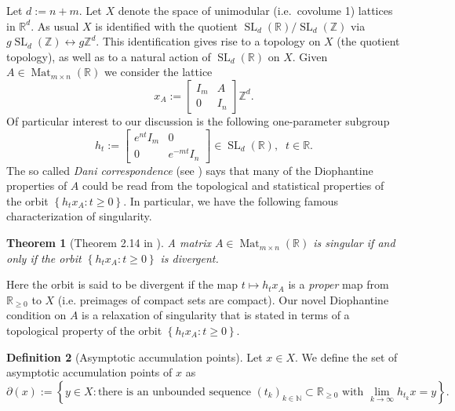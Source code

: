 \documentclass[reqno,11pt, twoside]{amsart}
\theoremstyle{plain}
\newtheorem{thm}{Theorem}[section]
\theoremstyle{definition}
\newtheorem{defn}[thm]{Definition}
\theoremstyle{definition}
\theoremstyle{remark}
\numberwithin{equation}{section}
\newcommand{\SL}{\operatorname{SL}}
\newcommand{\R}{{\mathbb{R}}}
\newcommand{\Z}{{\mathbb{Z}}}
\newcommand{\N}{{\mathbb{N}}}
\newcommand{\bR}{\mathbb{R}}
\newcommand{\bZ}{\mathbb{Z}}
\newcommand\seta[1]{\left\{#1\right\}}
\newcommand\on[1]{\operatorname{#1}}
\begin{document}
Let $d:=n+m$. Let $X$ denote the space of unimodular (i.e.\ covolume 1) lattices 
in $\bR^d$. As usual $X$ is identified with the quotient $\SL_d(\bR)/\SL_d(\bZ)$ via $g\SL_d(\bZ)\leftrightarrow g\bZ^d$. This identification gives rise to a topology on $X$ (the quotient topology), as well as to a natural action of $\SL_d(\bR)$ on $X$. 
Given $A \in \on{Mat}_{m\times n}(\R)$ we consider the lattice
\begin{equation}\label{eq: xA}
    x_A := \left[ {\begin{array}{cc} I_m & A \\ 
    0 & I_n  \end{array}}\right]\Z^d.
\end{equation}
Of particular interest to our discussion is the following one-parameter subgroup
\begin{equation}\label{eq: ht definition}
    h_t := \left[ {\begin{array}{cc} e^{nt}I_m & 0 \\ 
    0 & e^{-mt}I_n  \end{array}}\right] \in \SL_d(\bR),\;\; t\in \bR.
\end{equation}
The so called \textit{Dani correspondence} (see \cite{Dadivergent}) says that many 
of the Diophantine properties of $A$ could be read from the topological and statistical properties of the orbit $\seta{h_tx_A:t\ge 0}$. 
In particular, we have the following famous characterization of singularity.
\begin{thm}[Theorem 2.14 in \cite{Dadivergent}]\label{thm: Dani singular}
    A matrix $A \in \on{Mat}_{m\times n}(\R)$ is singular if and only if the orbit 
    $\seta{h_tx_A:t\ge 0}$
    is divergent.
\end{thm}
Here the orbit is said to be divergent if the map $t\mapsto h_tx_A$ is a \textit{proper} map from $\bR_{\ge0}$ to $X$ (i.e. preimages of compact sets are compact). 
Our novel Diophantine condition on $A$ is a relaxation of singularity
that is stated in terms of a topological property of the orbit $\seta{h_tx_A:t\ge 0}$. 
\begin{defn}[Asymptotic accumulation points]\label{defn: asymptotic limit points}
    Let $x \in X$. We define the set of asymptotic accumulation points of $x$ as
    \begin{equation*}
        \partial(x) := \left\lbrace y \in X: \text{there is an unbounded sequence } (t_k)_{k \in \N} \subset \R_{\geq 0} \text{ with } \lim_{k \to \infty} h_{t_k}x = y \right\rbrace.
    \end{equation*}
\end{defn}
\end{document}
